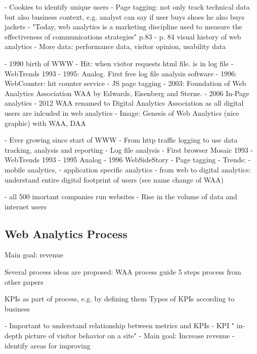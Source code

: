 - Cookies to identify unique users
- Page tagging: not only track technical data but also business context, e.g. analyst can say if user buys shoes he also buys jackets
- "Today, web analytics is a marketing discipline used to measure the effectiveness of communications strategies" p.83
- p. 84 visual history of web analytics
- More data: performance data, visitor opinion, usability data




- 1990 birth of WWW
- Hit: when visitor requests html file. is in log file
- WebTrends 1993
- 1995: Analog. First free log file analysis software
- 1996: WebCounter: hit counter service
- JS page tagging
- 2003: Foundation of Web Analytics Association WAA by Edwards, Eisenberg and Sterne.
- 2006 In-Page analytics
- 2012 WAA renamed to Digital Analytics Association as all digital users are inlcuded in web analytics
- Image: Genesis of Web Analytics (nice graphic) with WAA, DAA



- Ever growing since start of WWW
- From http traffic logging to use data tracking, analysis and reporting
- Log file analysis
- First browser Mosaic 1993
- WebTrends 1993
- 1995 Analog
- 1996 WebSideStory
- Page tagging
- Trends:
- mobile analytics,
- application specific analytics
- from web to digital analytics: understand entire digital footprint of users (see name change of WAA)



- all 500 imortant companies run websites
- Rise in the volume of data and internet users








\subsection{Web Analytics Process}


Main goal: revenue

Several process ideas are proposed:
WAA process guide
5 steps process from other papers


KPIs as part of process, e.g. by defining them
Types of KPIs according to business


- Important to understand relationship between metrics and KPIs
- KPI " in-depth picture of visitor behavior on a site"
- Main goal: Increase revenue
- identify areas for improving

